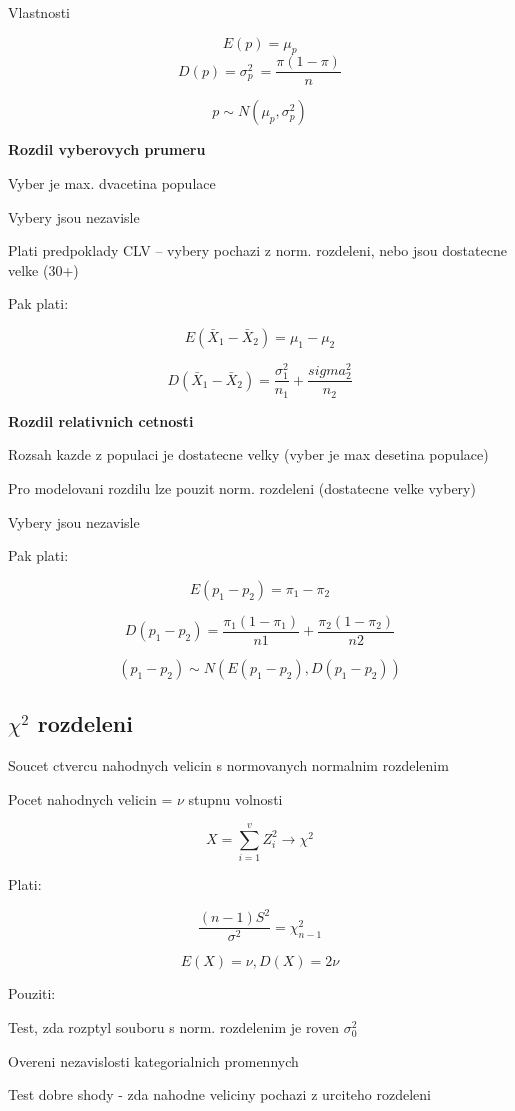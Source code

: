 \documentclass{article}
\begin{document}
Vlastnosti

\[ E(p) = \mu_p \]
\[ D(p) = \sigma_p^2\ = \frac{\pi (1 - \pi)}{n} \]

\[p \sim N(\mu_p, \sigma_p^2)\]


\textbf{Rozdil vyberovych prumeru}

Vyber je max. dvacetina populace

Vybery jsou nezavisle

Plati predpoklady CLV -- vybery pochazi z norm. rozdeleni, nebo jsou dostatecne velke (30+)

Pak plati:

\[ E(\bar{X}_1 - \bar{X}_2) = \mu_1 - \mu_2 \]

\[ D(\bar{X}_1 - \bar{X}_2) = \frac{\sigma_1^2}{n_1} + \frac{sigma_2^2}{n_2} \]

\textbf{Rozdil relativnich cetnosti}

Rozsah kazde z populaci je dostatecne velky (vyber je max desetina populace)

Pro modelovani rozdilu lze pouzit norm. rozdeleni (dostatecne velke vybery)

Vybery jsou nezavisle

Pak plati:

\[ E(p_1 - p_2) = \pi_1 - \pi_2 \]

\[ D(p_1 - p_2) = \frac{\pi_1(1 - \pi_1)}{n1} + \frac{\pi_2(1 - \pi_2)}{n2}\]

\[ (p_1 - p_2) \sim N(E(p_1 - p_2), D(p_1 - p_2)) \]

\subsection{$\chi^2$ rozdeleni}

Soucet ctvercu nahodnych velicin s normovanych normalnim rozdelenim

Pocet nahodnych velicin = $\nu$ stupnu volnosti

\[ X = \sum_{i=1}^{v} Z_i^2 \rightarrow \chi^2 \]

Plati:

\[ \frac{(n-1) S^2}{\sigma^2} = \chi^2_{n-1} \]

\[E(X) = \nu, D(X) = 2\nu\]

Pouziti:

Test, zda rozptyl souboru s norm. rozdelenim je roven $\sigma_0^2$

Overeni nezavislosti kategorialnich promennych

Test dobre shody - zda nahodne veliciny pochazi z urciteho rozdeleni
\end{document}

